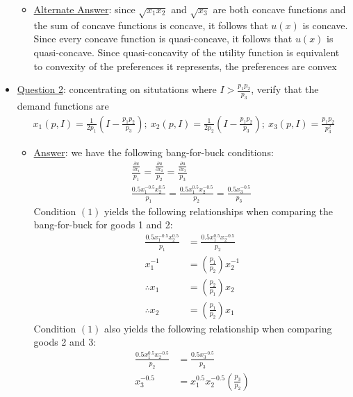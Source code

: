 \documentclass{article}
\begin{document}
\begin{itemize}
\begin{itemize}
    \item  \underline{Alternate Answer}: since $\sqrt{x_{1}x_{2}}$ and $\sqrt{x_{3}}$ are both concave functions and the sum of concave functions is concave, it follows that $u(x)$ is concave. Since every concave function is quasi-concave, it follows that $u(x)$ is quasi-concave. Since quasi-concavity of the utility function is equivalent to convexity of the preferences it represents, the preferences are convex
  \end{itemize}
  \item  \underline{Question 2}: concentrating on situtations where $I > \tfrac{p_{1}p_{2}}{p_{3}}$, verify that the demand functions are
  \begin{gather*}
    x_{1}(p,I) = \frac{1}{2p_{1}}(I - \frac{p_{1}p_{2}}{p_{3}}); \ x_{2}(p,I) = \frac{1}{2p_{2}}(I - \frac{p_{1}p_{2}}{p_{3}}); \ x_{3}(p,I) = \frac{p_{1}p_{2}}{p_{3}^{2}}
  \end{gather*}
  \begin{itemize}
    \item  \underline{Answer}: we have the following bang-for-buck conditions:
    \begin{gather*}
      \frac{\tfrac{\partial u}{\partial x_{1}}}{p_{1}} = \frac{\tfrac{\partial u}{\partial x_{2}}}{p_{2}} = \frac{\tfrac{\partial u}{\partial x_{3}}}{p_{3}} \\
      \frac{0.5x_{1}^{-0.5}x_{2}^{0.5}}{p_{1}} = \frac{0.5x_{1}^{0.5}x_{2}^{-0.5}}{p_{2}} = \frac{0.5x_{3}^{-0.5}}{p_{3}} \ \tag{1}
    \end{gather*}
    Condition $(1)$ yields the following relationships when comparing the bang-for-buck for goods 1 and 2:
    \begin{align*}
      \frac{0.5x_{1}^{-0.5}x_{2}^{0.5}}{p_{1}} &= \frac{0.5x_{1}^{0.5}x_{2}^{-0.5}}{p_{2}} \\
      x_{1}^{-1} &= (\frac{p_{1}}{p_{2}})x_{2}^{-1} \\
      \therefore x_{1} &= (\frac{p_{2}}{p_{1}})x_{2} \ \tag{2} \\
      \therefore x_{2} &= (\frac{p_{1}}{p_{2}})x_{1} \ \tag{3}
    \end{align*}
    Condition $(1)$ also yields the following relationship when comparing goods 2 and 3:
    \begin{align*}
      \frac{0.5x_{1}^{0.5}x_{2}^{-0.5}}{p_{2}} &= \frac{0.5x_{3}^{-0.5}}{p_{3}} \\
      x_{3}^{-0.5} &= x_{1}^{0.5}x_{2}^{-0.5} (\frac{p_{3}}{p_{2}}) \\

\end{align*}
\end{itemize}
\end{itemize}
\end{document}
